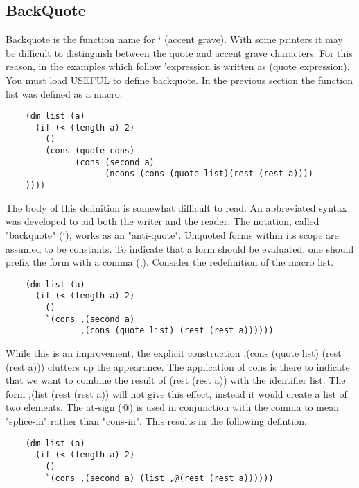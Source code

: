 \subsection{BackQuote}


{    Backquote is the function name for ` (accent grave).    With
    some printers it may be difficult to distinguish between the
    quote  and accent grave characters.  For this reason, in the
    examples which  follow  'expression  is  written  as  (quote
    expression).  You must load USEFUL to define backquote.
}
    In  the  previous section the function list was defined as a
    macro.

\begin{verbatim}
    (dm list (a)
      (if (< (length a) 2)
        ()
        (cons (quote cons)
              (cons (second a)
                    (ncons (cons (quote list)(rest (rest a))))
    ))))
\end{verbatim}
    The  body  of this definition is somewhat difficult to read.
    An abbreviated syntax was developed to aid both  the  writer
    and the reader.  The notation, called "backquote" (`), works
    as  an  "anti-quote".    Unquoted forms within its scope are
    assumed to be constants.  To indicate that a form should  be
    evaluated,  one  should  prefix  the  form with a comma (,).
    Consider the redefinition of the macro list.

\begin{verbatim}
    (dm list (a)
      (if (< (length a) 2)
        ()
        `(cons ,(second a)
               ,(cons (quote list) (rest (rest a))))))
\end{verbatim}
    While this is  an  improvement,  the  explicit  construction
    ,(cons  (quote  list)  (rest  (rest  a)))  clutters  up  the
    appearance.  The application of cons is  there  to  indicate
    that  we  want to combine the result of (rest (rest a)) with
    the identifier list.  The form ,(list (rest (rest  a))  will
    not  give this effect, instead it would create a list of two
    elements.  The at-sign (@) is used in conjunction  with  the
    comma  to  mean  "splice-in"  rather  than  "cons-in".  This
    results in the following defintion.

\begin{verbatim}
    (dm list (a)
      (if (< (length a) 2)
        ()
        `(cons ,(second a) (list ,@(rest (rest a))))))
\end{verbatim}


